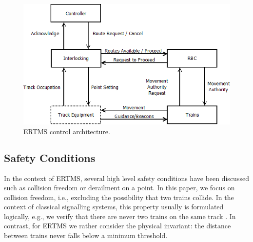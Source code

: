 \begin{figure}[H]
\centering
\includegraphics[scale=0.45]{images/architecture.png}
\caption{ERTMS control architecture.}
\label{fig:arch}
\end{figure}

\subsection{Safety Conditions}
\label{sec:safetycond}
In the context of ERTMS, several high level safety conditions have
been discussed such as collision freedom or derailment on a point.  In
this paper, we focus on collision freedom, i.e., excluding the
possibility that two trains collide.  In the context of classical
signalling systems, this property usually is formulated logically,
e.g., we verify that there are never two trains on the same track
\cite{sttt14}. In contrast, for ERTMS we rather consider the physical
invariant: the distance between trains never falls below a
minimum threshold.


